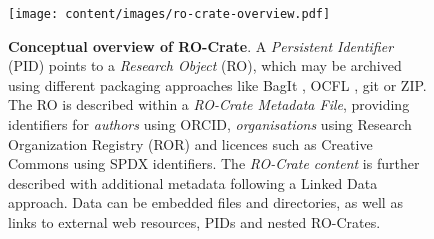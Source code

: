 \begin{figure}[t!]
    \centering
    \texttt{[image: content/images/ro-crate-overview.pdf]}
\caption{\textbf{Conceptual overview of RO-Crate}. A \emph{Persistent Identifier} (PID) \cite{doi:10.1371/journal.pbio.2001414} points to a \emph{Research Object} (RO), which may be archived using different packaging approaches like BagIt \cite{doi:10.17487/rfc8493}, OCFL \cite{ocfl_2020}, git or ZIP. The RO is described within a \emph{RO-Crate Metadata File}, providing identifiers for \emph{authors} using ORCID, \emph{organisations} using Research Organization Registry (ROR) \cite{doi:10.6087/kcse.192} and licences such as Creative Commons using SPDX identifiers. The \emph{RO-Crate content} is further described with additional metadata following a Linked Data approach. Data can be embedded files and directories, as well as links to external web resources, PIDs and nested RO-Crates.}
    \label{fig:conceptual}
\end{figure}
